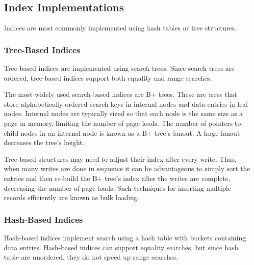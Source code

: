 \documentclass[12pt,titlepage]{article}
\begin{document}
    \subsection{Index Implementations}
      Indices are most commonly implemented using hash tables or tree structures.

      \subsubsection{Tree-Based Indices}
        Tree-based indices are implemented using search trees. Since search trees are ordered, tree-based indices support both equality
        and range searches.

        The most widely used search-based indices are B+ trees. These are trees that store alphabetically ordered search keys in internal
        nodes and data entries in leaf nodes. Internal nodes are typically sized so that each node is the same size as a page in memory,
        limiting the number of page loads. The number of pointers to child nodes in an internal node is known as a B+ tree's fanout. A
        large fanout decreases the tree's height.

        Tree-based structures may need to adjust their index after every write. Thus, when many writes are done in sequence it can be
        advantageous to simply sort the entries and then re-build the B+ tree's index after the writes are complete, decreasing the number
        of page loads. Such techniques for inserting multiple records efficiently are known as bulk loading.

      \subsubsection{Hash-Based Indices}
        Hash-based indices implement search using a hash table with buckets containing data entries. Hash-based indices can support equality
        searches, but since hash table are unordered, they do not speed up range searches.
\end{document}
